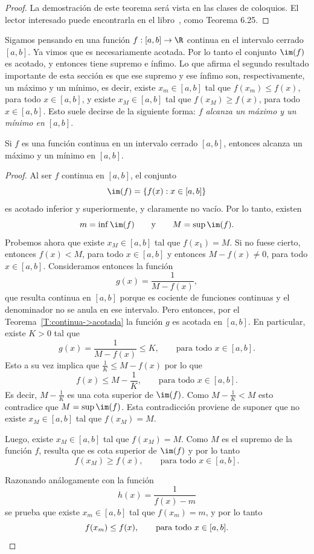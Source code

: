 \begin{proof}
    La demostración de este teorema será vista en las clases de coloquios. El lector interesado puede encontrarla en el libro~\cite{Noriega}, como Teorema 6.25.
\end{proof}

Sigamos pensando en una función $f:[a,b]\to\R$ continua en el intervalo cerrado $[a,b]$. Ya vimos que es necesariamente acotada. Por lo tanto el conjunto $\im(f)$ es acotado, y entonces tiene supremo e ínfimo.
Lo que afirma el segundo resultado importante de esta sección es que ese supremo y ese ínfimo son, respectivamente, un máximo y un mínimo, es decir, existe $x_m\in[a,b]$ tal que $f(x_m)\le f(x)$, para todo $x\in[a,b]$, y existe $x_M\in[a,b]$ tal que $f(x_M)\ge f(x)$, para todo $x\in[a,b]$. Esto suele decirse de la siguiente forma: \emph{$f$ alcanza un máximo y un mínimo en $[a,b]$}.

\begin{theorem}\label{T:continua->maximo y minimo}
    Si $f$ es una función continua en un intervalo cerrado $[a,b]$, entonces alcanza un máximo y un mínimo en $[a,b]$.
\end{theorem}

\begin{proof}
    Al ser $f$ continua en $[a,b]$, el conjunto
    \[
    \im(f)=\{f(x) : x\in[a,b]\}
    \]
    es acotado inferior y superiormente, y claramente no vacío.
    Por lo tanto, existen
    \[
    m=\inf \im(f)
    \qquad\text{y}\qquad
    M=\sup \im(f).
    \]
    Probemos ahora que existe $x_M\in[a,b]$ tal que $f(x_1)=M$.
    Si no fuese cierto, entonces $f(x)<M$, para todo $x\in[a,b]$ y entonces $M-f(x)\neq 0$, para todo $x\in[a,b]$.
    Consideramos entonces la función
    \[
    g(x)=\frac{1}{M-f(x)},
    \]
    que resulta continua en $[a,b]$ porque es cociente de funciones continuas y el denominador no se anula en ese intervalo.
    Pero entonces, por el Teorema~\ref{T:continua->acotada} la función $g$ es acotada en $[a,b]$. En particular, existe $K>0$ tal que 
    \[
    g(x)=\frac{1}{M-f(x)}\le K,
    \qquad\text{para todo $x\in[a,b]$}.
    \]
    Esto a su vez implica que $\frac1K \le M -f(x)$ por lo que
    \[
    f(x)\le M-\frac1K,
    \qquad\text{para todo $x\in[a,b]$}.
    \]
    Es decir, $M-\frac1K$ es una cota superior de $\im(f)$.
    Como $M-\frac1K<M$ esto contradice que $M=\sup\im(f)$.
    Esta contradicción proviene de suponer que no existe $x_M\in[a,b]$ tal que $f(x_M)=M$.
    
    Luego, existe $x_M\in[a,b]$ tal que $f(x_M)=M$.
    Como $M$ es el supremo de la función $f$, resulta que es cota superior de $\im(f)$ y por lo tanto
    \[
    f(x_M)\ge f(x), 
    \qquad\text{para todo $x\in[a,b]$}.
    \]

    Razonando análogamente con la función
    \[
    h(x) = \frac1{f(x)-m}
    \]
    se prueba que existe $x_m\in [a,b]$ tal que $f(x_m)=m$, y por lo tanto
    \[
    f(x_m)\le f(x), 
    \qquad\text{para todo $x\in[a,b]$}.
    \qedhere
    \]
\end{proof}

